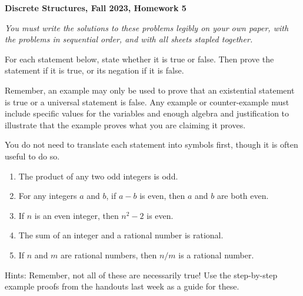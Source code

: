 \documentclass[12pt, letterpaper]{report}
\begin{document}
{\textbf{Discrete Structures, Fall 2023, Homework 5}}

\medbreak

\textit{You must write the solutions to these problems legibly on your own paper, with
the problems in sequential order, and with all sheets stapled together.}

\bigskip

For each statement below, state whether it is true or false. Then prove the statement if it is true,
or its negation if it is false.\medskip

Remember, an example may only be used to prove that an existential statement is true or a universal
statement is false. Any example or counter-example must include specific values for the variables
and enough algebra and justification to illustrate that the example proves what you are claiming
it proves.\medskip

You do not need to translate each statement into symbols first, though it is often useful to do so.

\begin{enumerate}

        \item The product of any two odd integers is odd.  %
        
        \item For any integers $a$ and $b$, if $a-b$ is even, then $a$ and $b$ are both even.
        
        \item If $n$ is an even integer, then $n^2-2$ is even.  %
        
        \item The sum of an integer and a rational number is rational.  %
        
       	\item If $n$ and $m$ are rational numbers, then $n/m$ is a rational number.
                

\end{enumerate}
Hints: Remember, not all of these are necessarily true!  Use the step-by-step example proofs from the handouts last week
as a guide for these. 
\end{document}
